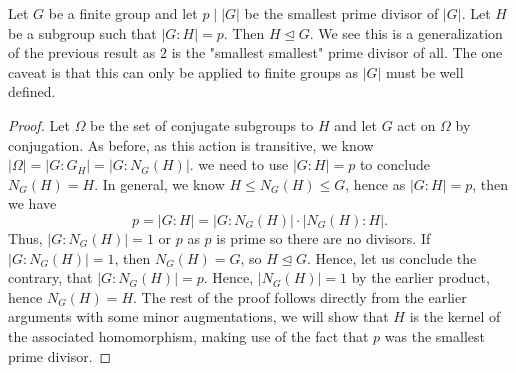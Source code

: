 \begin{therorem}
	Let \(G\) be a finite group and let \(p \mid \left| G \right| \) be the smallest prime divisor of \(\left| G \right| \). Let \(H\) be a subgroup such that \(\left| G : H \right|  = p\). Then \(H \trianglelefteq G\). We see this is a generalization of the previous result as \(2\) is the "smallest smallest" prime divisor of all. The one caveat is that this can only be applied to finite groups as \(\left| G \right| \) must be well defined.
\end{therorem}
\begin{proof}
	Let \(\Omega\) be the set of conjugate subgroups to \(H\) and let \(G\) act on \(\Omega\) by  conjugation. As before, as this action is transitive, we know \\\(\left| \Omega \right|  = \left| G : G_{H} \right| = \left| G : N_{G} \left( H \right)  \right| \). we need to use \(\left| G:H \right| = p\) to conclude \(N_{G}\left( H \right) = H\). In general, we know \(H \le N_{G}\left( H \right) \le G\), hence as \(\left| G :H\right| = p\), then we have \[
		p = \left| G:H \right|  = \left| G : N_{G}\left( H \right)  \right|\cdot \left| N_{G}\left( H \right) : H \right|
	.\]
	Thus, \(\left| G:N_{G}\left( H \right)  \right| = 1 \text{ or } p\) as \(p\) is prime so there are no divisors.
	If \(\left| G : N_{G}\left( H \right)  \right| = 1\), then \(N_{G}\left( H \right) = G\), so \(H\trianglelefteq G\). Hence, let us conclude the contrary, that \(\left| G : N_{G}\left( H \right)  \right| = p\). Hence, \(\left| N_{G}\left( H \right)  \right| = 1\) by the earlier product, hence \(N_{G}\left( H \right) = H\). The rest of the proof follows directly from the earlier arguments with some minor augmentations, we will show that \(H\) is the kernel of the associated homomorphism, making use of the fact that \(p\) was the smallest prime divisor.
\end{proof}
